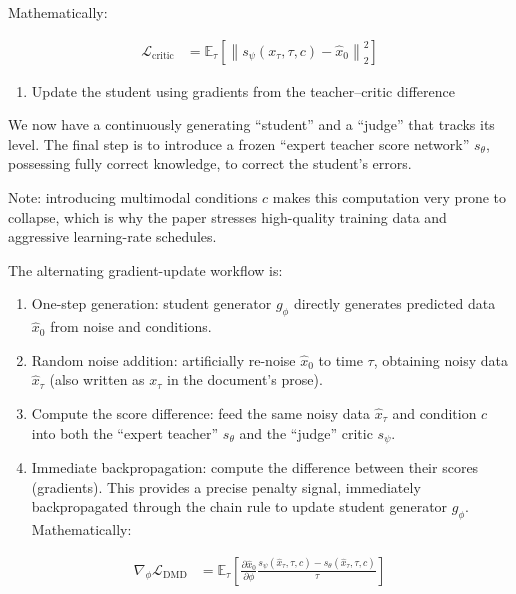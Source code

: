 Mathematically:

\[
\begin{aligned}
\mathcal{L}_{\mathrm{critic}}
&=\mathbb{E}_{\tau}\left[\left\|s_\psi(x_\tau,\tau,c)-\hat{x}_0\right\|_2^2\right]
\end{aligned}
\]

\begin{enumerate}
\def\labelenumi{\arabic{enumi}.}
\setcounter{enumi}{1}
\tightlist
\item
  Update the student using gradients from the teacher--critic difference
\end{enumerate}

We now have a continuously generating ``student'' and a ``judge'' that tracks its level. The final step is to introduce a frozen ``expert teacher score network'' \(s_\theta\), possessing fully correct knowledge, to correct the student's errors.

Note: introducing multimodal conditions \(c\) makes this computation very prone to collapse, which is why the paper stresses high-quality training data and aggressive learning-rate schedules.

The alternating gradient-update workflow is:

\begin{enumerate}
\def\labelenumi{\arabic{enumi}.}
\tightlist
\item
  One-step generation: student generator \(g_\phi\) directly generates predicted data \(\hat{x}_0\) from noise and conditions.
\item
  Random noise addition: artificially re-noise \(\hat{x}_0\) to time \(\tau\), obtaining noisy data \(\hat{x}_\tau\) (also written as \(x_\tau\) in the document's prose).
\item
  Compute the score difference: feed the same noisy data \(\hat{x}_\tau\) and condition \(c\) into both the ``expert teacher'' \(s_\theta\) and the ``judge'' critic \(s_\psi\).
\item
{}
  Immediate backpropagation: compute the difference between their scores (gradients). This provides a precise penalty signal, immediately backpropagated through the chain rule to update student generator \(g_\phi\). Mathematically:
\end{enumerate}

\[
\begin{aligned}
\nabla_\phi\mathcal{L}_{\mathrm{DMD}}
&=\mathbb{E}_{\tau}\left[
\frac{\partial\hat{x}_0}{\partial\phi}
\frac{s_\psi(\hat{x}_\tau,\tau,c)-s_\theta(\hat{x}_\tau,\tau,c)}{\tau}
\right]
\end{aligned}
\]

